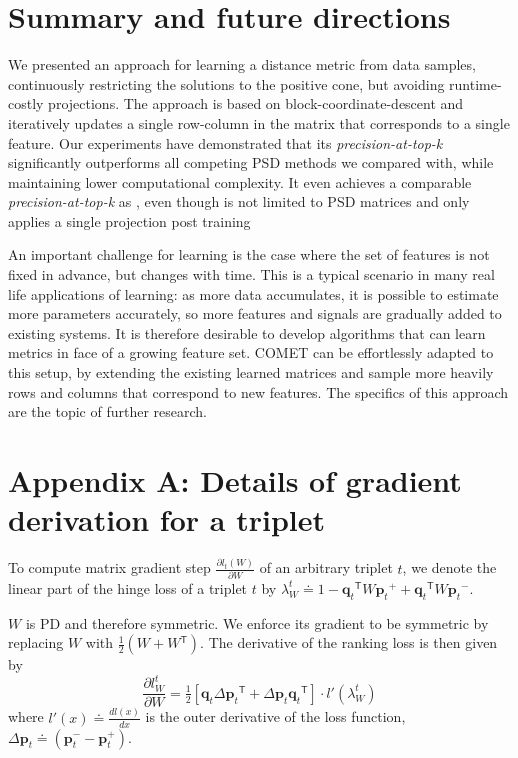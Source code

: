 \documentclass{article} %
\newcommand\mat[1]{{#1}}
\renewcommand\vec[1]{\mathbf{#1}}
\newcommand{\T}{{}^\mathsf{T}}
\newcommand{\W}{\mat{W}}
\newcommand{\eqdef}{\doteq}
\newcommand{\q}{{\vec{q}}}
\newcommand{\p}{{\vec{p}}}
\newcommand{\trip}{{t}}
\newcommand{\qt}{{\q_{\trip}}}
\newcommand{\pt}{{\p_{\trip}}}
\begin{document}
\section{Summary and future directions}
We presented an approach for learning a distance metric from data samples, continuously restricting the solutions to the positive cone, but avoiding runtime-costly projections. The approach is based on block-coordinate-descent and iteratively updates a single row-column in the matrix that corresponds to a single feature. Our experiments have demonstrated that its \textit{precision-at-top-k} significantly outperforms all competing PSD methods we compared with, while maintaining lower computational complexity. It even achieves a comparable \textit{precision-at-top-k} as \cite{OASIS}, even though \cite{OASIS} is not limited to PSD matrices and only applies a single projection post training

An important challenge for learning is the case where the set of features is not fixed in advance, but changes with time. This is a typical scenario in many real life applications of learning: as more data accumulates, it is possible to estimate more parameters accurately, so more features and signals are gradually added to existing systems. It is therefore desirable to develop algorithms that can learn metrics in face of a growing feature set. COMET can be effortlessly adapted to this setup, by extending the existing learned matrices and sample more heavily rows and columns that correspond to new features. The specifics of this approach are the topic of further research.


\appendix
\section*{Appendix A: Details of gradient derivation for a triplet}
\label{appendix-grad}

To compute matrix gradient step $\frac{\partial {l_t (\W)}}{\partial \W}$ of an arbitrary triplet $t$, we denote the linear part of the hinge loss of a triplet $t$ by $\lambda_{W}^t \eqdef 
1-\qt\T \W \pt^{+} + \qt\T\W\pt^{-}.$

$\W$ is PD and therefore symmetric. We enforce its gradient to be symmetric by replacing $\W$ with $\tfrac{1}{2}(\W + \W\T)$.
The derivative of the ranking loss is then given by
\begin{equation}
\frac{\partial {l_{\W}^{t}}}{\partial \W} = \tfrac{1}{2}[\vec{q}_{t}\Delta\vec{p}_{t}\T  + \Delta\vec{p}_{t}\vec{q}_{t}\T]\cdot {l'}(\lambda_{W}^t)
\label{dlossranking}
\end{equation} where $l'(x) \eqdef \frac{d{l(x)}}{dx}$ is the outer derivative of the loss function, $\Delta\vec{p}_{t} \eqdef (\vec{p}_{t}^{-} - \vec{p}_{t}^{+})$.
\end{document}

